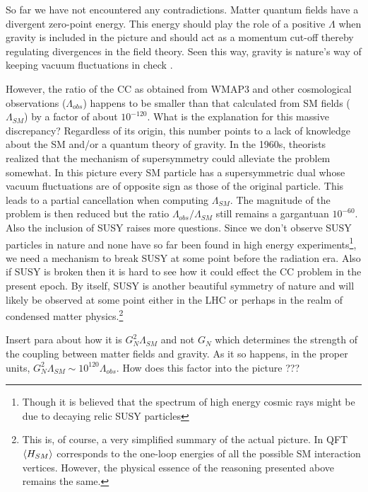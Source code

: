 \begin{doublespace}
So far we have not encountered any contradictions. Matter quantum fields have a divergent zero-point energy. This energy should play the role of a positive $\Lambda$ when gravity is included in the picture and should act as a momentum cut-off thereby regulating divergences in the field theory. Seen this way, gravity is nature's way of keeping vacuum fluctuations in check \cite{Crane1985Space-time}.

However, the ratio of the CC as obtained from WMAP3 and other cosmological observations ($\Lambda_{obs}$) happens to be smaller than that calculated from SM fields ($\Lambda_{SM}$) by a factor of about $10^{-120}$. What is the explanation for this massive discrepancy? Regardless of its origin, this number points to a lack of knowledge about the SM and/or a quantum theory of gravity. In the 1960s, theorists realized that the mechanism of supersymmetry could alleviate the problem somewhat. In this picture every SM particle has a supersymmetric dual whose vacuum fluctuations are of opposite sign as those of the original particle. This leads to a partial cancellation when computing $\Lambda_{SM}$. The magnitude of the problem is then reduced but the ratio $\Lambda_{obs} / \Lambda_{SM}$ still remains a gargantuan $10^{-60}$. Also the inclusion of SUSY raises more questions. Since we don't observe SUSY particles in nature and none have so far been found in high energy experiments\footnote{Though it is believed that the spectrum of high energy cosmic rays might be due to decaying relic SUSY particles}, we need a mechanism to break SUSY at some point before the radiation era. Also if SUSY is broken then it is hard to see how it could effect the CC problem in the present epoch. By itself, SUSY is another beautiful symmetry of nature and will likely be observed at some point either in the LHC or perhaps in the realm of condensed matter physics.\footnote{This is, of course, a very simplified summary of the actual picture. In QFT $\langle H_{SM}\rangle$ corresponds to the one-loop energies of all the possible SM interaction vertices. However, the physical essence of the reasoning presented above remains the same.}

Insert para about how it is $G_{N}^{2} \Lambda_{SM}$ and not $G_{N}$ which determines the strength of the coupling between matter fields and gravity. As it so happens, in the proper units, $G_{N}^{2} \Lambda_{SM} \sim 10^{120} \Lambda_{obs}$. How does this factor into the picture ???


\end{doublespace}
